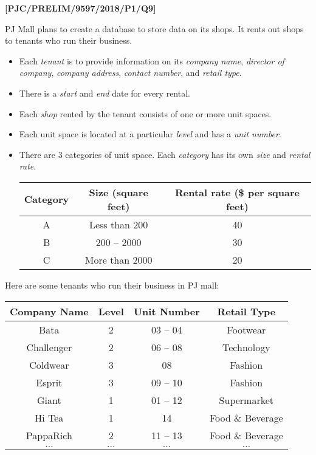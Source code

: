 \item \textbf{{[}PJC/PRELIM/9597/2018/P1/Q9{]} }

PJ Mall plans to create a database to store data on its shops. It
rents out shops to tenants who run their business.
\begin{itemize}
\item Each \emph{tenant} is to provide information on its \emph{company
name}, \emph{director of company}, \emph{company address}, \emph{contact
number}, and \emph{retail type}. 
\item There is a \emph{start} and \emph{end} date for every rental.
\item Each \emph{shop} rented by the tenant consists of one or more unit
spaces. 
\item Each unit space is located at a particular \emph{level} and has a\emph{
unit number}. 
\item There are 3 categories of unit space. Each \emph{category} has its
own \emph{size} and \emph{rental rate}. 
\noindent \begin{center}
\begin{tabular}{|c|c|c|}
\hline 
Category & Size (square feet) & Rental rate (\$ per square feet)\tabularnewline
\hline 
A & Less than 200 & 40\tabularnewline
\hline 
B & 200 -- 2000 & 30\tabularnewline
\hline 
C & More than 2000 & 20\tabularnewline
\hline 
\end{tabular} 
\par\end{center}

\end{itemize}
Here are some tenants who run their business in PJ mall: 
\noindent \begin{center}
\begin{tabular}{|c|c|c|c|}
\hline 
Company Name & Level & Unit Number & Retail Type\tabularnewline
\hline 
Bata & 2 & 03 -- 04 & Footwear\tabularnewline
\hline 
Challenger & 2 & 06 -- 08 & Technology\tabularnewline
\hline 
Coldwear & 3 & 08 & Fashion\tabularnewline
\hline 
Esprit & 3 & 09 -- 10 & Fashion\tabularnewline
\hline 
Giant & 1 & 01 -- 12 & Supermarket\tabularnewline
\hline 
Hi Tea & 1 & 14 & Food \& Beverage\tabularnewline
\hline 
PappaRich & 2 & 11 -- 13 & Food \& Beverage\tabularnewline
\hline 
$\dots$ & $\dots$ & $\dots$ & $\dots$\tabularnewline
\hline 
\end{tabular}
\par\end{center}
